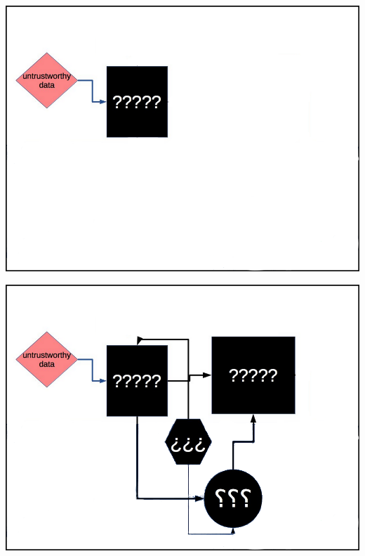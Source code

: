 \documentclass[aspectratio=169,x11names]{beamer}
\begin{document}
\begin{frame}
\begin{center}
\includegraphics[height=0.65\textheight,keepaspectratio]{images/deep_neural_networks_2.png} 
\end{center}
\end{frame}

\begin{frame}
\begin{center}
\includegraphics[height=0.65\textheight,keepaspectratio]{images/deep_neural_networks_3.png} 
\end{center}
\end{frame}
\end{document}
